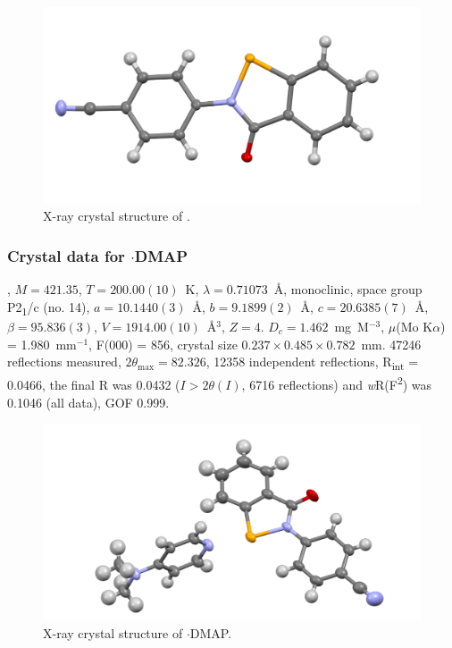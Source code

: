 \begin{refsection}
\begin{figure}
  \includegraphics[width=0.6\linewidth]{Figures/ebs-4cn-xtal.pdf}
  \caption{X-ray crystal structure of \texorpdfstring{}{C14 H8 N2 O Se}.}
\end{figure}

\subsubsection{Crystal data for \texorpdfstring{$\cdot$DMAP}{C21 H18 N4 O Se}}
, $M=421.35$, $T=200.00(10)$~K, $\lambda=0.71073$~\AA, monoclinic, space group P2\textsubscript{1}/c (no. 14), $a = 10.1440(3)$~\AA, $b = 9.1899(2)$~\AA, $c = 20.6385(7)$~\AA, $\beta = 95.836(3)$\degree, $V = 1914.00(10)$~\AA$^{3}$, $Z = 4$. $D_{c}= 1.462$~mg~M$^{-3}$, $\mu$(Mo K$\alpha$) = 1.980~mm$^{-1}$, F(000) = 856, crystal size $0.237 \times 0.485 \times 0.782$~mm. 47246 reflections measured, $2\theta_{\mathrm{max}}=82.326$\degree, 12358 independent reflections, R\textsubscript{int} = 0.0466, the final R was 0.0432 ($I > 2\theta(I)$, 6716 reflections) and \emph{w}R(F\textsuperscript{2}) was 0.1046 (all data), GOF 0.999.

\begin{figure}
  \includegraphics[width=0.6\linewidth]{Figures/ebs-4cn-dmap-xtal.pdf}
  \caption{X-ray crystal structure of \texorpdfstring{$\cdot$DMAP}{C21 H18 N4 O Se}.}
\end{figure}


\end{refsection}

